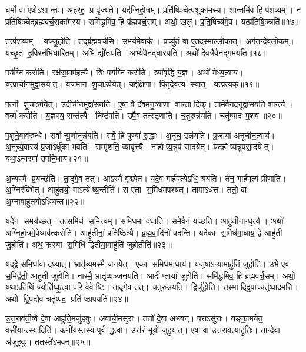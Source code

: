 घ॒र्मो वा ए॒षोऽशान्तः।
अह॑रह॒ प्र वृ॑ज्यते।
यद॑ग्निहो॒त्रम्।
प्रति॑षिञ्चेत्प॒शुका॑मस्य।
शा॒न्तमि॑व॒ हि प॑श॒व्यम्।
न प्रति॑षिञ्चेद्ब्रह्मवर्च॒सका॑मस्य।
समि॑द्धमिव॒ हि ब्र॑ह्मवर्च॒सम्।
अथो॒ खलु॑।
प्र॒ति॒षिच्य॑मे॒व।
यत्प्र॑तिषि॒ञ्चति॑॥१७॥

तत्प॑श॒व्यम्।
यज्जु॒होति॑।
तद्ब्र॑ह्मवर्च॒सि।
उ॒भय॑मे॒वाक॑।
प्रच्यु॑तं॒ वा ए॒तद॒स्माल्लो॒कात्।
अग॑तन्देवलो॒कम्।
यच्छृ॒त ह॒विरन॑भिघारितम्।
अ॒भि द्यो॑तयति।
अ॒भ्ये॑वैन॑द्घारयति।
अथो॑ देव॒त्रैवैन॑द्गमयति॥१८॥

पर्य॑ग्नि करोति।
रक्ष॑सा॒मप॑हत्यै।
त्रिः पर्य॑ग्नि करोति।
त्र्या॑वृ॒द्धि य॒ज्ञः।
अथो॑ मेध्य॒त्वाय॑।
यत्प्रा॒चीन॑मुद्वा॒सयेत्।
यज॑मान शु॒चाऽर्प॑येत्।
यद्द॑क्षि॒णा।
पि॒तृ॒दे॒व॒त्य स्यात्।
यत्प्र॒त्यक्॥१९॥

पत्नी शु॒चाऽर्प॑येत्।
उ॒दी॒चीन॒मुद्वा॑सयति।
ए॒षा वै दे॑वमनु॒ष्याणा शा॒न्ता दिक्।
तामे॒वैन॒दनूद्वा॑सयति॒ शान्त्यै।
वर्त्म॑ करोति।
य॒ज्ञस्य॒ सन्त॑त्यै।
निष्ट॑पति।
उपै॒व तत्स्तृ॑णाति।
च॒तुरुन्न॑यति।
चतु॑ष्पादः प॒शव॑॥२०॥

प॒शूने॒वाव॑रुन्धे।
सर्वान्पू॒र्णानुन्न॑यति।
सर्वे॒ हि पुण्या॑ रा॒द्धाः।
अ॒नूच॒ उन्न॑यति।
प्र॒जाया॑ अनूचीन॒त्वाय॑।
अ॒नूच्ये॒वास्य॑ प्र॒जाऽर्धु॑का भवति।
सम्मृ॑शति॒ व्यावृ॑त्त्यै।
नाहोष्य॒न्नुप॑ सादयेत्।
यदहोष्यन्नुपसा॒दयेत्।
यथा॒ऽन्यस्मा॑ उपनि॒धाय॑॥२१॥

अ॒न्यस्मै प्र॒यच्छ॑ति।
ता॒दृगे॒व तत्।
आऽस्मै॑ वृश्च्येत।
यदे॒व गार्\mbox{}ह॑पत्येऽधि॒ श्रय॑ति।
तेन॒ गार्\mbox{}ह॑पत्यं प्रीणाति।
अ॒ग्निर॑बिभेत्।
आहु॑तयो॒ माऽत्येष्य॒न्तीति॑।
स ए॒ता स॒मिध॑मपश्यत्।
तामाऽध॑त्त।
ततो॒ वा अ॒ग्नावाहु॑तयोऽध्रियन्त॥२२॥

यदे॑न स॒मय॑च्छत्।
तत्स॒मिध॑ समि॒त्त्वम्।
स॒मिध॒मा द॑धाति।
समे॒वैनं॑ यच्छति।
आहु॑तीना॒न्धृत्यै।
अथो॑ अग्निहो॒त्रमे॒वेध्मव॑त्करोति।
आहु॑तीनां॒ प्रति॑ष्ठित्यै।
ब्र॒ह्म॒वा॒दिनो॑ वदन्ति।
यदेका स॒मिध॑मा॒धाय॒ द्वे आहु॑ती जु॒होति॑।
अथ॒ कस्या स॒मिधि॑ द्वि॒तीया॒माहु॑तिं जुहो॒तीति॑॥२३॥

यद्द्वे स॒मिधा॑वा द॒ध्यात्।
भ्रातृ॑व्यमस्मै जनयेत्।
एका स॒मिध॑मा॒धाय॑।
यजु॑षा॒ऽन्यामाहु॑तिं जुहोति।
उ॒भे ए॒व स॒मिद्व॑ती॒ आहु॑ती जुहोति।
नास्मै॒ भ्रातृ॑व्यञ्जनयति।
आदीप्तायां जुहोति।
समि॑द्धमिव॒ हि ब्र॑ह्मवर्च॒सम्।
अथो॒ यथाऽति॑थिं॒ ज्योति॑ष्कृ॒त्वा प॑रि॒ वेवेष्टि।
ता॒दृगे॒व तत्।
च॒तुरुन्न॑यति।
द्विर्जु॑होति।
तस्माद्द्वि॒पाच्चतु॑ष्पादमत्ति।
अथो द्वि॒पद्ये॒व चतु॑ष्पद॒ प्रति॑ ष्ठापयति॥२४॥

उ॒त्त॒राव॑तीँ॒व्वै दे॒वा आहु॑ति॒मजु॑हवुः।
अवा॑ची॒मसु॑राः।
ततो॑ दे॒वा अभ॑वन्।
पराऽसु॑राः।
यङ्का॒मये॑त॒ वसी॑यान्त्स्या॒दिति॑।
कनी॑य॒स्तस्य॒ पूर्व हु॒त्वा।
उत्त॑रं॒ भूयो॑ जुहुयात्।
ए॒षा वा उ॑त्त॒राव॒त्याहु॑तिः।
तान्दे॒वा अ॑जुहवुः।
तत॒स्ते॑ऽभवन्॥२५॥

